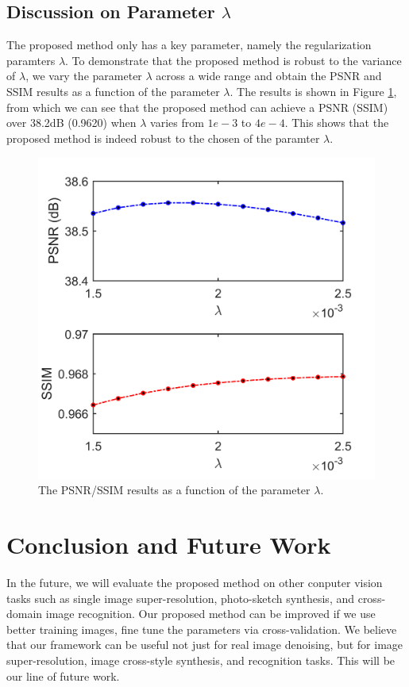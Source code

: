 \documentclass[10pt,twocolumn,letterpaper]{article}
\begin{document}
\subsection{Discussion on Parameter $\lambda$}
The proposed method only has a key parameter, namely the regularization paramters $\lambda$. To demonstrate that the proposed method is robust to the variance of $\lambda$, we vary the parameter $\lambda$ across a wide range and obtain the PSNR and SSIM results as a function of the parameter $\lambda$. The results is shown in Figure \ref{fig10}, from which we can see that the proposed method can achieve a PSNR (SSIM) over 38.2dB (0.9620) when $\lambda$ varies from $1e-3$ to $4e-4$. This shows that the proposed method is indeed robust to the chosen of the paramter $\lambda$.
\begin{figure}
\includegraphics[width=1\linewidth]{images/param.png}
\caption{The PSNR/SSIM results as a function of the parameter $\lambda$.}
\label{fig10}
\end{figure}

\section{Conclusion and Future Work}

In the future, we will evaluate the proposed method on other conputer vision tasks such as single image super-resolution, photo-sketch synthesis, and cross-domain image recognition. Our proposed method can be improved if we use better training images, fine tune the parameters via cross-validation. We believe that our framework can be useful not just for real image denoising, but for image super-resolution, image cross-style synthesis, and recognition tasks. This will be our line of future work.

{\small


}
\end{document}
